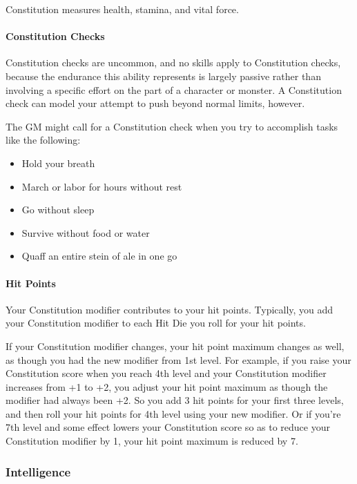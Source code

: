 \documentclass[
]{article}
\providecommand{\tightlist}{%
  \setlength{\itemsep}{0pt}\setlength{\parskip}{0pt}}
\begin{document}
Constitution measures health, stamina, and vital force.

\hypertarget{constitution-checks}{%
\paragraph{Constitution Checks}\label{constitution-checks}}

Constitution checks are uncommon, and no skills apply to Constitution
checks, because the endurance this ability represents is largely passive
rather than involving a specific effort on the part of a character or
monster. A Constitution check can model your attempt to push beyond
normal limits, however.

The GM might call for a Constitution check when you try to accomplish
tasks like the following:

\begin{itemize}
\tightlist
\item
  Hold your breath
\item
  March or labor for hours without rest
\item
  Go without sleep
\item
  Survive without food or water
\item
  Quaff an entire stein of ale in one go
\end{itemize}

\hypertarget{hit-points}{%
\paragraph{Hit Points}\label{hit-points}}

Your Constitution modifier contributes to your hit points. Typically,
you add your Constitution modifier to each Hit Die you roll for your hit
points.

If your Constitution modifier changes, your hit point maximum changes as
well, as though you had the new modifier from 1st level. For example, if
you raise your Constitution score when you reach 4th level and your
Constitution modifier increases from +1 to +2, you adjust your hit point
maximum as though the modifier had always been +2. So you add 3 hit
points for your first three levels, and then roll your hit points for
4th level using your new modifier. Or if you're 7th level and some
effect lowers your Constitution score so as to reduce your Constitution
modifier by 1, your hit point maximum is reduced by 7.

\hypertarget{intelligence-1}{%
\subsubsection{Intelligence}\label{intelligence-1}}
\end{document}
